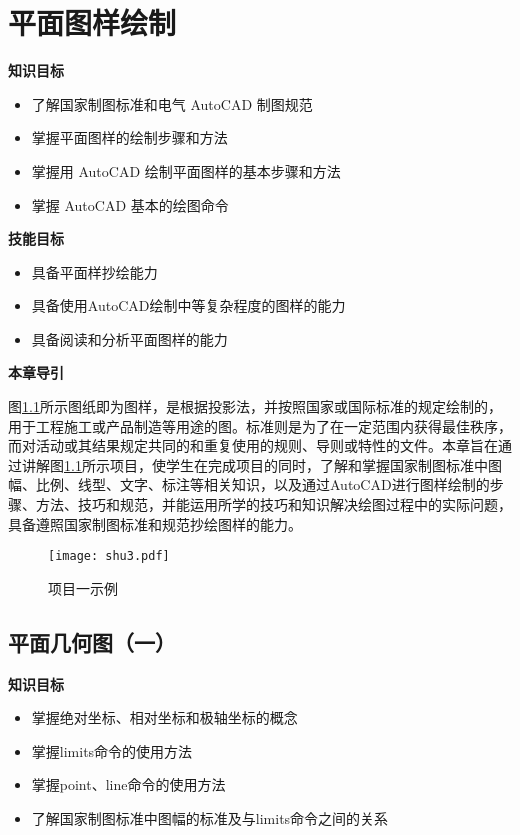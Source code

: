 \chapter{平面图样绘制}
{\bfseries 知识目标}
\begin{itemize}
\item 了解国家制图标准和电气 AutoCAD 制图规范
\item 掌握平面图样的绘制步骤和方法
\item 掌握用 AutoCAD 绘制平面图样的基本步骤和方法
\item 掌握 AutoCAD 基本的绘图命令
\end{itemize}

{\bfseries 技能目标}
\begin{itemize}
\item 具备平面样抄绘能力
\item 具备使用AutoCAD绘制中等复杂程度的图样的能力
\item 具备阅读和分析平面图样的能力
\end{itemize}

{\bfseries 本章导引}

图\ref{fig:shangmu1}所示图纸即为图样，是根据投影法，并按照国家或国际标准的规定绘制的，用于工程施工或产品制造等用途的图。标准则是为了在一定范围内获得最佳秩序，而对活动或其结果规定共同的和重复使用的规则、导则或特性的文件。本章旨在通过讲解图\ref{fig:shangmu1}所示项目，使学生在完成项目的同时，了解和掌握国家制图标准中图幅、比例、线型、文字、标注等相关知识，以及通过AutoCAD进行图样绘制的步骤、方法、技巧和规范，并能运用所学的技巧和知识解决绘图过程中的实际问题，具备遵照国家制图标准和规范抄绘图样的能力。
\noindent
\begin{figure}[htbp]
\centering
\texttt{[image: shu3.pdf]}
\caption{项目一示例}\label{fig:shangmu1}
\end{figure}
\indent

\section{平面几何图（一）}\label{sec:gongzhi}

{\bfseries 知识目标}
\begin{itemize}
\item 掌握绝对坐标、相对坐标和极轴坐标的概念
\item 掌握limits命令的使用方法
\item 掌握point、line命令的使用方法
\item 了解国家制图标准中图幅的标准及与limits命令之间的关系
\end{itemize}

